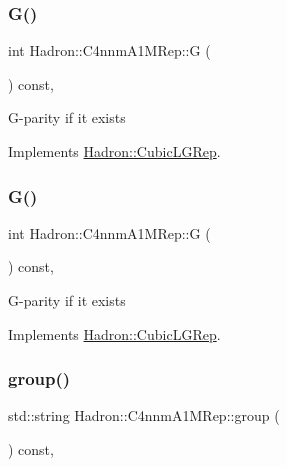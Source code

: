 \subsubsection{\texorpdfstring{G()}{G()}\hspace{0.1cm}{\footnotesize\ttfamily [2/3]}}
{\footnotesize\ttfamily int Hadron\+::\+C4nnm\+A1\+M\+Rep\+::G (\begin{DoxyParamCaption}{ }\end{DoxyParamCaption}) const\hspace{0.3cm}{\ttfamily [inline]}, {\ttfamily [virtual]}}

G-\/parity if it exists 

Implements \mbox{\hyperlink{structHadron_1_1CubicLGRep_ace26f7b2d55e3a668a14cb9026da5231}{Hadron\+::\+Cubic\+L\+G\+Rep}}.

\mbox{\label{structHadron_1_1C4nnmA1MRep_a80fdc5fe56a8c2c040f46f97a4bee86a}} 
\subsubsection{\texorpdfstring{G()}{G()}\hspace{0.1cm}{\footnotesize\ttfamily [3/3]}}
{\footnotesize\ttfamily int Hadron\+::\+C4nnm\+A1\+M\+Rep\+::G (\begin{DoxyParamCaption}{ }\end{DoxyParamCaption}) const\hspace{0.3cm}{\ttfamily [inline]}, {\ttfamily [virtual]}}

G-\/parity if it exists 

Implements \mbox{\hyperlink{structHadron_1_1CubicLGRep_ace26f7b2d55e3a668a14cb9026da5231}{Hadron\+::\+Cubic\+L\+G\+Rep}}.

\mbox{\label{structHadron_1_1C4nnmA1MRep_a06930a4ede24739b06df899ea0e6893d}} 
\subsubsection{\texorpdfstring{group()}{group()}\hspace{0.1cm}{\footnotesize\ttfamily [1/3]}}
{\footnotesize\ttfamily std\+::string Hadron\+::\+C4nnm\+A1\+M\+Rep\+::group (\begin{DoxyParamCaption}{ }\end{DoxyParamCaption}) const\hspace{0.3cm}{\ttfamily [inline]}, {\ttfamily [virtual]}}

